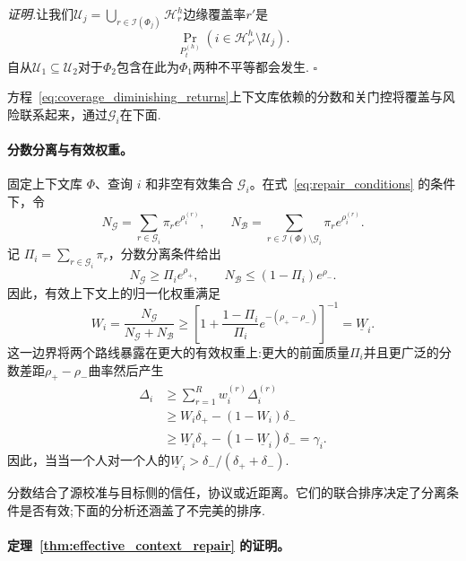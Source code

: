 \noindent\emph{证明.}让我们$\mathcal U_j=\bigcup_{r\in\mathcal I(\Phi_j)}\mathcal H_r^h$边缘覆盖率$r'$是\[
\Pr_{P_t^{(h)}}(i\in\mathcal H_{r'}^h\setminus\mathcal U_j).
\]自从$\mathcal U_1\subseteq\mathcal U_2$对于$\Phi_2$包含在此为$\Phi_1$两种不平等都会发生.
\hfill$\square$

方程~\eqref{eq:coverage_diminishing_returns}上下文库依赖的分数和关门控将覆盖与风险联系起来，通过$\mathcal G_i$在下面.

\paragraph{分数分离与有效权重。}
\label{app:evidence-separation}

固定上下文库 $\Phi$、查询 $i$ 和非空有效集合 $\mathcal G_i$。在式~\eqref{eq:repair_conditions} 的条件下，令
\[
N_{\mathcal G}
=\sum_{r\in\mathcal G_i}\pi_r e^{\rho_i^{(r)}},
\qquad
N_{\mathcal B}
=\sum_{r\in\mathcal I(\Phi)\setminus\mathcal G_i}\pi_r e^{\rho_i^{(r)}}.
\]
记 $\Pi_i=\sum_{r\in\mathcal G_i}\pi_r$，分数分离条件给出
\[
N_{\mathcal G}\geq\Pi_i e^{\rho_+},
\qquad
N_{\mathcal B}\leq(1-\Pi_i)e^{\rho_-}.
\]
因此，有效上下文上的归一化权重满足
\begin{equation}
W_i
=\frac{N_{\mathcal G}}{N_{\mathcal G}+N_{\mathcal B}}
\geq
\left[1+\frac{1-\Pi_i}{\Pi_i}
e^{-(\rho_+-\rho_-)}\right]^{-1}
=\underline W_i.
\label{eq:appendix_effective_weight}
\end{equation}
这一边界将两个路线暴露在更大的有效权重上:更大的前面质量$\Pi_i$并且更广泛的分数差距$\rho_+-\rho_-$曲率然后产生
\begin{equation}
\begin{aligned}
\Delta_i
&\geq\sum_{r=1}^{R} w_i^{(r)}\Delta_i^{(r)}\\
&\geq W_i\delta_+-(1-W_i)\delta_-\\
&\geq\underline W_i\delta_+-(1-\underline W_i)\delta_-
=\gamma_i.
\end{aligned}
\label{eq:appendix_aggregate_gain}
\end{equation}因此，当当一个人对一个人的$\underline W_i>\delta_-/(\delta_++\delta_-)$.

分数结合了源校准与目标侧的信任，协议或近距离。它们的联合排序决定了分离条件是否有效;下面的分析还涵盖了不完美的排序.

\paragraph{定理~\ref{thm:effective_context_repair} 的证明。}

